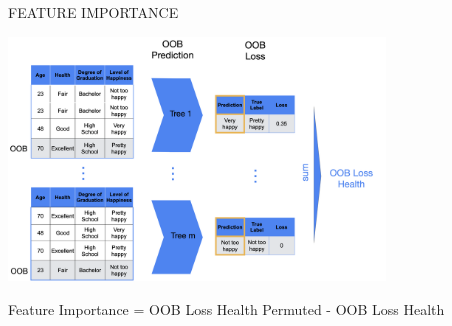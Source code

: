 \documentclass[11pt,compress,t,notes=noshow, xcolor=table]{beamer}
\begin{document}
\begin{vbframe}{FEATURE IMPORTANCE}
\begin{center}
    \includegraphics[width = 0.75\textwidth]{figure_man/nutshell-randomforest-OOB_2.png}
\end{center}

\vspace{0.5cm}
\begin{center}
Feature Importance = OOB Loss Health Permuted - OOB Loss Health
\end{center}
\end{vbframe}




\endlecture
\end{document}
